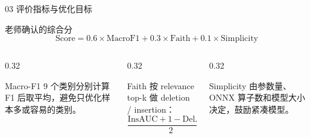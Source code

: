 \documentclass[aspectratio=169]{beamer}
\begin{document}
\begin{frame}{03 评价指标与优化目标}
    \small
    \begin{block}{老师确认的综合分}
        \[
            \mathrm{Score}=0.6 \times \mathrm{MacroF1}
            +0.3 \times \mathrm{Faith}
            +0.1 \times \mathrm{Simplicity}
        \]
    \end{block}
    \begin{columns}[T,onlytextwidth]
        \begin{column}{0.32\textwidth}
            \begin{block}{Macro-F1}
                9 个类别分别计算 F1 后取平均，避免只优化样本多或容易的类别。
            \end{block}
        \end{column}
        \begin{column}{0.32\textwidth}
            \begin{block}{Faith}
                按 relevance top-k 做 deletion / insertion：
                \[
                \frac{\mathrm{InsAUC}+1-\mathrm{DelAUC}}{2}
                \]
            \end{block}
        \end{column}
        \begin{column}{0.32\textwidth}
            \begin{block}{Simplicity}
                由参数量、ONNX 算子数和模型大小决定，鼓励紧凑模型。
            \end{block}
        \end{column}
    \end{columns}
\end{frame}
\end{document}
